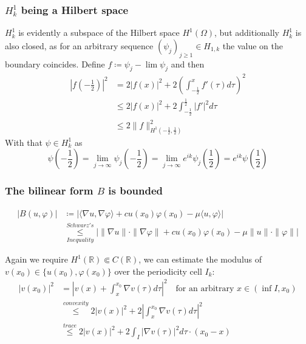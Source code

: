 \documentclass[14pt,a4paper]{scrartcl}
\numberwithin{equation}{section}
\newcommand{\R}{\mathbb{R}}
\begin{document}
\subsubsection{$H^{1}_{k}$ being a Hilbert space}
$H^{1}_{k}$ is evidently a subspace of the Hilbert space $H^{1}(\Omega)$, but additionally $H^{1}_{k}$ is also closed, as for an arbitrary sequence $(\psi_{j})_{j \geq 1} \in H_{1, k}$ the value on the boundary coincides. Define $f \coloneqq \psi_{j} - \lim \psi_{j}$ and then
	\begin{align*}
		| f(-\frac{1}{2}) |^{2} & = 2 | f(x) |^{2} + 2 \left( \int_{-\frac{1}{2}}^{x} f'(\tau) d\tau \right)^{2} \\
			& \leq 2 |f(x)|^{2} + 2 \int_{- \frac{1}{2}}^{\frac{1}{2}} |f'|^{2} d\tau \\
			& \leq 2 \| f \|^{2}_{H^{1}(-\frac{1}{2}, \frac{1}{2})}
	\end{align*}
	With that $\psi \in H^{1}_{k}$ as
	\[ \psi(-\frac{1}{2}) = \lim_{j \rightarrow \infty} \psi_{j}(-\frac{1}{2}) = \lim_{j \rightarrow \infty} e^{ik} \psi_{j}(\frac{1}{2}) = e^{ik} \psi(\frac{1}{2}) \]

\subsubsection{The bilinear form $B$ is bounded}
\begin{align*} 
	| B(u, \varphi)| & \coloneqq \left| \langle \nabla u, \nabla \varphi \rangle + c u(x_{0}) \varphi(x_{0}) - \mu \langle u , \varphi \rangle  \right|\\
		& \overset{Schwarz's}{\underset{Inequality}{\leq}} \big| \| \nabla u \| \cdot \| \nabla \varphi \| + c u(x_{0}) \varphi(x_{0}) - \mu \| u \| \cdot \| \varphi\| \big|	
\end{align*}

Again we require $H^{1}(\R) \Subset C(\R)$, we can estimate the modulus of $v(x_{0}) \in \{ u(x_{0}), \varphi(x_{0}) \}$ over the periodicity cell $I_{k}$: 
\begin{align*}
	|v(x_{0})|^{2} & = \left| v(x) + \int_{x}^{x_{0}} \nabla v( \tau ) d\tau \right|^{2} \quad \text{for an arbitrary } x \in ( \inf I, x_{0}) \\
	& \overset{convexity}{\leq} 2 |v(x)|^{2} + 2 \left| \int_{x}^{x_{0}} \nabla v(\tau) d\tau \right|^{2} \\
	& \overset{trace}{\leq}	2 |v(x)|^{2} + 2 \int_{I} \left| \nabla v(\tau) \right|^{2} d\tau \cdot(x_{0} - x)
\end{align*}
\end{document}
